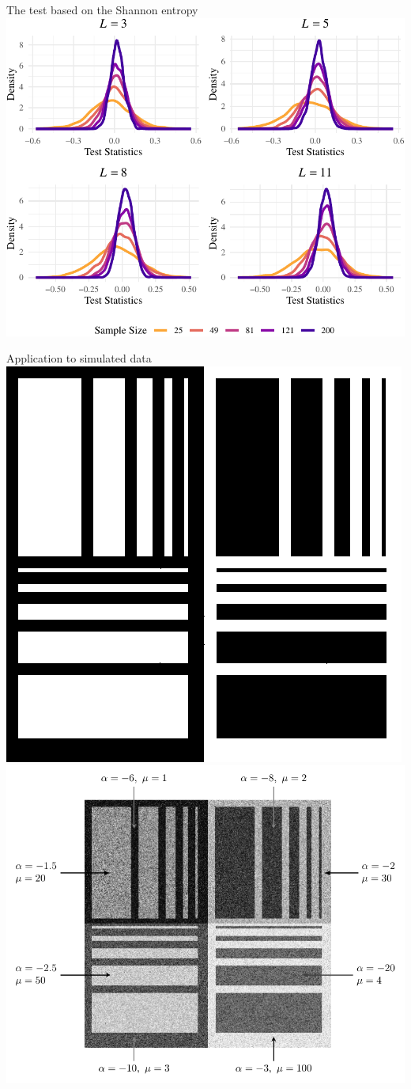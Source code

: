 \documentclass[table,aspectratio=169]{beamer}
\begin{document}
{
\begin{frame}{The test based on the Shannon entropy}
\centering
\includegraphics[width=0.7\linewidth]{R1-Identifying-Heterogeneity-in-SAR-Data-with-New-Test-Statistics_files/figure-latex/Plot_density-1}
\end{frame}
}

{
\begin{frame}{Application to simulated data}
\centering
\includegraphics[width=.42\linewidth]{../Figures/PNG/Phantom1}
\includegraphics[width=.57\linewidth]{../Figures/PNG/Phantom_label/Phantom_labels}
\end{frame}
}
\end{document}

